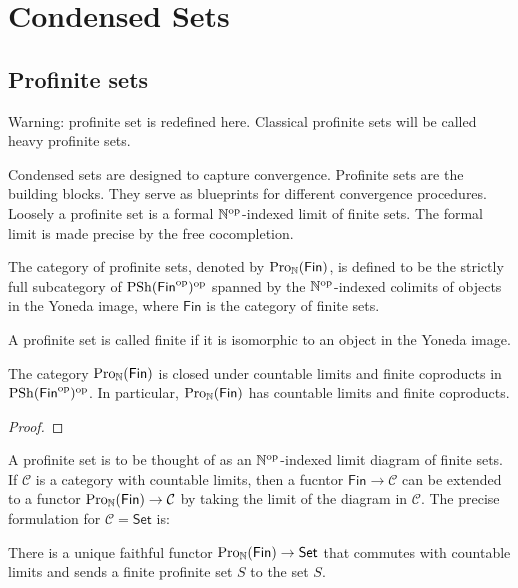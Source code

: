 \section{Condensed Sets}

\subsection{Profinite sets}

Warning: profinite set is redefined here. Classical profinite sets will be called heavy profinite sets.

Condensed sets are designed to capture convergence.
Profinite sets are the building blocks. They serve as blueprints for different convergence procedures.
Loosely a profinite set is a formal $ \mathbb{N}^{\mathrm{op}} $-indexed limit of finite sets.
The formal limit is made precise by the free cocompletion.
\begin{definition}
The category of profinite sets, denoted by $ \mathrm{Pro}_{\mathbb{N}}(\mathsf{Fin}) $,
is defined to be the strictly full subcategory of $ \operatorname{PSh} (\mathsf{Fin} ^{\mathrm{op}})^{\mathrm{op}} $ spanned by
the $ \mathbb{N}^{\mathrm{op}} $-indexed colimits of objects in the Yoneda image,
where $ \mathsf{Fin} $ is the category of finite sets.

A profinite set is called finite if it is isomorphic to an object in the Yoneda image.
\end{definition}

\begin{proposition}
The category $ \mathrm{Pro}_{\mathbb{N}}(\mathsf{Fin}) $ is closed under countable limits and finite coproducts in $ \operatorname{PSh} (\mathsf{Fin} ^{\mathrm{op}})^{\mathrm{op}} $.
In particular, $ \mathrm{Pro}_{\mathbb{N}}(\mathsf{Fin}) $ has countable limits and finite coproducts.
\end{proposition}

\begin{proof}

\end{proof}

A profinite set is to be thought of as an $ \mathbb{N}^{\mathrm{op}} $-indexed limit diagram of finite sets.
If $ \mathcal{C} $ is a category with countable limits, then a fucntor $ \mathsf{Fin}\to \mathcal{C} $
can be extended to a functor $ \mathrm{Pro}_{\mathbb{N}}(\mathsf{Fin})\to \mathcal{C} $ by taking the limit of the diagram in $ \mathcal{C} $.
The precise formulation for $ \mathcal{C} = \mathsf{Set} $ is:

\begin{lemma}
There is a unique faithful functor $ \mathrm{Pro}_{\mathbb{N}}(\mathsf{Fin}) \to \mathsf{Set} $ that commutes with countable limits
and sends a finite profinite set $ S $ to the set $ S $.
\label{profi::forgetful-to-set}
\end{lemma}

